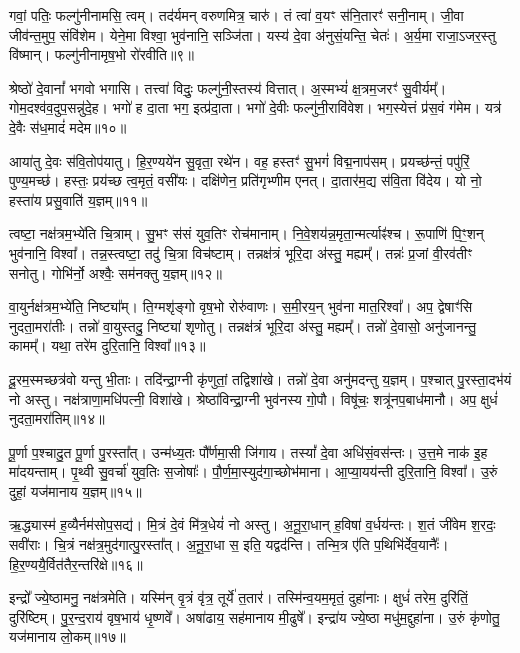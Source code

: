 गवां॒ पतिः॒ फल्गु॑नीनामसि॒ त्वम्। तद॑र्यमन् वरुणमित्र॒ चारु॑। तं त्वा॑ व॒यꣳ स॑नि॒तारꣳ॑ सनी॒नाम्। जी॒वा जीव॑न्त॒मुप॒ संवि॑शेम। येने॒मा विश्वा॒ भुव॑नानि॒ सञ्जि॑ता। यस्य॑ दे॒वा अ॑नुसं॒यन्ति॒ चेतः॑। अ॒र्य॒मा राजा॒ऽजर॒स्तु वि॑ष्मान्। फल्गु॑नीनामृष॒भो रो॑रवीति॥९॥ 

श्रेष्ठो॑ दे॒वानां᳚ भगवो भगासि। तत्त्वा॑ विदुः॒ फल्गु॑नी॒स्तस्य॑ वित्तात्। अ॒स्मभ्यं॑ क्ष॒त्रम॒जरꣳ॑ सु॒वीर्यम्᳚। गोम॒दश्व॑व॒दुप॒सन्नु॑\-दे॒ह। भगो॑ ह दा॒ता भग॒ इत्प्र॑दा॒ता। भगो॑ दे॒वीः फल्गु॑नी॒रावि॑वेश। भग॒स्येत्तं प्र॑स॒वं ग॑मेम। यत्र॑ दे॒वैः स॑ध॒मादं॑ मदेम॥१०॥ 

आया॑तु दे॒वः स॑वि॒तोप॑यातु। हि॒र॒ण्यये॑न सु॒वृता॒ रथे॑न। वह॒\an{} हस्तꣳ॑ सु॒भगं॑ विद्म॒नाप॑सम्। प्रयच्छ॑न्तं॒ पपु॑रिं॒ पुण्य॒मच्छ॑। हस्तः॒ प्रय॑च्छ त्व॒मृतं॒ वसी॑यः। दक्षि॑णेन॒ प्रति॑गृभ्णीम एनत्। दा॒तार॑म॒द्य स॑वि॒ता वि॑देय। यो नो॒ हस्ता॑य प्रसु॒वाति॑ य॒ज्ञम्॥११॥ 

त्वष्टा॒ नक्ष॑त्रम॒भ्ये॑ति चि॒त्राम्। सु॒भꣳ स॑सं युव॒तिꣳ रोच॑मानाम्। नि॒वे॒शय॑न्न॒\-मृता॒न्मर्त्याꣴ॑श्च। रू॒पाणि॑ पि॒ꣳ॒शन् भुव॑नानि॒ विश्वा᳚। तन्न॒स्त्वष्टा॒ तदु॑ चि॒त्रा विच॑ष्टाम्। तन्नक्ष॑त्रं भूरि॒दा अ॑स्तु॒ मह्यम्᳚। तन्नः॑ प्र॒जां वी॒रव॑तीꣳ सनोतु। गोभि॑र्नो॒ अश्वैः॒ सम॑नक्तु य॒ज्ञम्॥१२॥ 

वा॒युर्नक्ष॑त्रम॒भ्ये॑ति॒ निष्ट्या᳚म्। ति॒ग्मशृ॑ङ्गो वृष॒भो रोरु॑वाणः। स॒मी॒रय॒न् भुव॑ना मात॒रिश्वा᳚। अप॒ द्वेषाꣳ॑सि नुदता॒मरा॑तीः। तन्नो॑ वा॒युस्तदु॒ निष्ट्या॑ शृणोतु। तन्नक्ष॑त्रं भूरि॒दा अ॑स्तु॒ मह्यम्᳚। तन्नो॑ दे॒वासो॒ अनु॑जानन्तु॒ कामम्᳚। यथा॒ तरे॑म दुरि॒तानि॒ विश्वा᳚॥१३॥ 

दू॒रम॒स्मच्छत्र॑वो यन्तु भी॒ताः। तदि॑न्द्रा॒ग्नी कृ॑णुतां॒ तद्विशा॑खे। तन्नो॑ दे॒वा अनु॑मदन्तु य॒ज्ञम्। प॒श्चात् पु॒रस्ता॒दभ॑यं नो अस्तु। नक्ष॑त्राणा॒मधि॑पत्नी॒ विशा॑खे। श्रेष्ठा॑विन्द्रा॒ग्नी भुव॑नस्य गो॒पौ। विषू॑चः॒ शत्रू॑नप॒बाध॑मानौ। अप॒ क्षुधं॑ नुदता॒मरा॑तिम्॥१४॥ 

पू॒र्णा प॒श्चादु॒त पू॒र्णा पु॒रस्ता᳚त्। उन्म॑ध्य॒तः पौ᳚र्णमा॒सी जि॑गाय। तस्यां᳚ दे॒वा अधि॑सं॒वस॑न्तः। उ॒त्त॒मे नाक॑ इ॒ह मा॑दयन्ताम्। पृ॒थ्वी सु॒वर्चा॑ युव॒तिः स॒जोषाः᳚। पौ॒र्ण॒मा॒स्युद॑गा॒च्छोभ॑माना। आ॒प्या॒यय॑न्ती दुरि॒तानि॒ विश्वा᳚। उ॒रुं दुहां॒ यज॑मानाय य॒ज्ञम्॥१५॥ 

ऋ॒द्ध्यास्म॑ ह॒व्यैर्नम॑सोप॒सद्य॑। मि॒त्रं दे॒वं मि॑त्र॒धेयं॑ नो अस्तु। अ॒नू॒रा॒धान् ह॒विषा॑ व॒र्धय॑न्तः। श॒तं जी॑वेम श॒रदः॒ सवी॑राः। चि॒त्रं नक्ष॑त्र॒मुद॑गात्पु॒रस्ता᳚त्। अ॒नू॒रा॒धा स॒ इति॒ यद्वद॑न्ति। तन्मि॒त्र ए॑ति प॒थिभि॑र्देव॒यानैः᳚। हि॒र॒ण्ययै॒र्वित॑तै\-र॒न्तरि॑क्षे॥१६॥ 

इन्द्रो᳚ ज्ये॒ष्ठामनु॒ नक्ष॑त्रमेति। यस्मि॑न् वृ॒त्रं वृ॑त्र॒ तूर्ये॑ त॒तार॑। तस्मि॑न्व॒यम॒मृतं॒ दुहा॑नाः। क्षुधं॑ तरेम॒ दुरि॑तिं॒ दुरि॑ष्टिम्। पु॒र॒न्द॒राय॑ वृष॒भाय॑ धृ॒ष्णवे᳚। अषा॑ढाय॒ सह॑मानाय मी॒ढुषे᳚। इन्द्रा॑य ज्ये॒ष्ठा मधु॑म॒द्दुहा॑ना। उ॒रुं कृ॑णोतु॒ यज॑मानाय लो॒कम्॥१७॥ 

